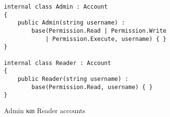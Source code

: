 \begin{listing}[H]
\begin{verbatim}
internal class Admin : Account
{
    public Admin(string username) : 
        base(Permission.Read | Permission.Write 
            | Permission.Execute, username) { }
}

internal class Reader : Account
{
    public Reader(string username) : 
        base(Permission.Read, username) { }
}
\end{verbatim}
\caption{Admin και Reader accounts}
\label{flagSubclasses}
\end{listing}